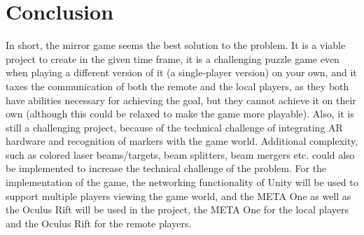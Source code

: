 \chapter{Conclusion} \label{cha:conclusion}
In short, the mirror game seems the best solution to the problem. It is a viable project
to create in the given time frame, it is a challenging puzzle game even when playing a 
different version of it (a single-player version) on your own, and it taxes the communication
of both the remote and the local players, as they both have abilities necessary for
achieving the goal, but they cannot achieve it on their own (although this could be relaxed
to make the game more playable). Also, it is still a challenging project, because of the
technical challenge of integrating AR hardware and recognition of markers with the game
world. Additional complexity, such as colored laser beams/targets, beam splitters, beam mergers
etc. could also be implemented to increase the technical challenge of the problem. For the 
implementation of the game, the networking functionality of Unity will be used to support
multiple players viewing the game world, and the META One as well as the Oculus Rift will
be used in the project, the META One for the local players and the Oculus Rift for the
remote players.
